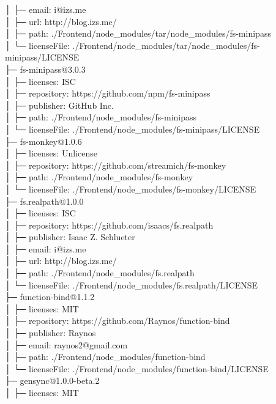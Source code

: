 │  ├─ email: i@izs.me\\
│  ├─ url: http://blog.izs.me/\\
│  ├─ path: ./Frontend/node\_modules/tar/node\_modules/fs-minipass\\
│  └─ licenseFile: ./Frontend/node\_modules/tar/node\_modules/fs-minipass/LICENSE\\
├─ fs-minipass@3.0.3\\
│  ├─ licenses: ISC\\
│  ├─ repository: https://github.com/npm/fs-minipass\\
│  ├─ publisher: GitHub Inc.\\
│  ├─ path: ./Frontend/node\_modules/fs-minipass\\
│  └─ licenseFile: ./Frontend/node\_modules/fs-minipass/LICENSE\\
├─ fs-monkey@1.0.6\\
│  ├─ licenses: Unlicense\\
│  ├─ repository: https://github.com/streamich/fs-monkey\\
│  ├─ path: ./Frontend/node\_modules/fs-monkey\\
│  └─ licenseFile: ./Frontend/node\_modules/fs-monkey/LICENSE\\
├─ fs.realpath@1.0.0\\
│  ├─ licenses: ISC\\
│  ├─ repository: https://github.com/isaacs/fs.realpath\\
│  ├─ publisher: Isaac Z. Schlueter\\
│  ├─ email: i@izs.me\\
│  ├─ url: http://blog.izs.me/\\
│  ├─ path: ./Frontend/node\_modules/fs.realpath\\
│  └─ licenseFile: ./Frontend/node\_modules/fs.realpath/LICENSE\\
├─ function-bind@1.1.2\\
│  ├─ licenses: MIT\\
│  ├─ repository: https://github.com/Raynos/function-bind\\
│  ├─ publisher: Raynos\\
│  ├─ email: raynos2@gmail.com\\
│  ├─ path: ./Frontend/node\_modules/function-bind\\
│  └─ licenseFile: ./Frontend/node\_modules/function-bind/LICENSE\\
├─ gensync@1.0.0-beta.2\\
│  ├─ licenses: MIT\\
